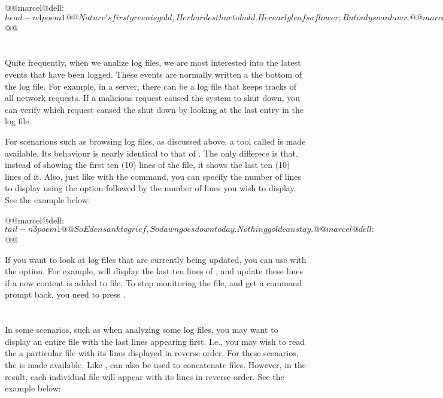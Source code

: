 \begin{command_line}[Bash]
@@marcel@dell:~$ head -n 4 poem1@@
Nature's first green is gold,
Her hardest hue to hold.
Her early leafs a flower;
But only so an hour.
@@marcel@dell:~$ @@
\end{command_line}

\section{}
 Quite frequently, when we analize log files, we are most interested into the latest events that have been logged. These events are normally written a the bottom of the log file. For example, in a server, there can be a log file that keeps tracks of all network requests. If a malicious request caused the system to shut down, you can verify which request caused the shut down by looking at the last entry in the log file.

 For scenarious such as browsing log files, as discussed above, a tool called  is made available. Its behaviour is nearly identical to that of . The only differece is that, instead of showing the first ten (10) lines of the file, it shows the last ten (10) lines of it. Also, just like with the  command, you can specify the number of lines to display using the  option followed by the number of lines you wish to display. See the example below:

 \begin{command_line}[Bash]
@@marcel@dell:~$ tail -n 3 poem1@@
So Eden sank to grief,
So dawn goes down to day.
Nothing gold can stay.
@@marcel@dell:~$ @@
\end{command_line}

If you want to look at log files that are currently being updated, you can use  with the  option. For example,  will display the last ten lines of , and update these lines if a new content is added to file. To stop monitoring the file, and get a command prompt back, you need to press .

\section{}

In some scenarios, such as when analyzing some log files, you may want to display an entire file with the last lines appearing first. I.e., you may wish to read the a particular file with its lines displayed in reverse order. For these scenarios, the  is made available. Like ,  can also be used to concatenate files. However, in the result, each individual file will appear with its lines in reverse order. See the example below:

